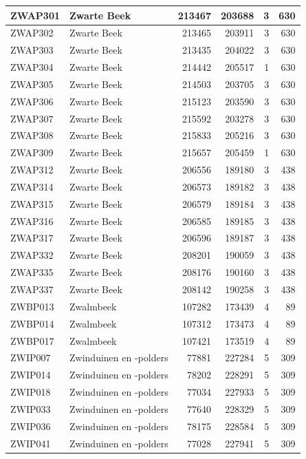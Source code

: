 \documentclass[11pt,]{book}
\begin{document}
\begin{table}
\begin{tabular}[t]{l|l|r|r|r|r}
\hline
ZWAP301 & Zwarte Beek & 213467 & 203688 & 3 & 630\\
\hline
ZWAP302 & Zwarte Beek & 213465 & 203911 & 3 & 630\\
\hline
ZWAP303 & Zwarte Beek & 213435 & 204022 & 3 & 630\\
\hline
ZWAP304 & Zwarte Beek & 214442 & 205517 & 1 & 630\\
\hline
ZWAP305 & Zwarte Beek & 214503 & 203705 & 3 & 630\\
\hline
ZWAP306 & Zwarte Beek & 215123 & 203590 & 3 & 630\\
\hline
ZWAP307 & Zwarte Beek & 215592 & 203278 & 3 & 630\\
\hline
ZWAP308 & Zwarte Beek & 215833 & 205216 & 3 & 630\\
\hline
ZWAP309 & Zwarte Beek & 215657 & 205459 & 1 & 630\\
\hline
ZWAP312 & Zwarte Beek & 206556 & 189180 & 3 & 438\\
\hline
ZWAP314 & Zwarte Beek & 206573 & 189182 & 3 & 438\\
\hline
ZWAP315 & Zwarte Beek & 206579 & 189184 & 3 & 438\\
\hline
ZWAP316 & Zwarte Beek & 206585 & 189185 & 3 & 438\\
\hline
ZWAP317 & Zwarte Beek & 206596 & 189187 & 3 & 438\\
\hline
ZWAP332 & Zwarte Beek & 208201 & 190059 & 3 & 438\\
\hline
ZWAP335 & Zwarte Beek & 208176 & 190160 & 3 & 438\\
\hline
ZWAP337 & Zwarte Beek & 208142 & 190258 & 3 & 438\\
\hline
ZWBP013 & Zwalmbeek & 107282 & 173439 & 4 & 89\\
\hline
ZWBP014 & Zwalmbeek & 107312 & 173473 & 4 & 89\\
\hline
ZWBP017 & Zwalmbeek & 107421 & 173519 & 4 & 89\\
\hline
ZWIP007 & Zwinduinen en -polders & 77881 & 227284 & 5 & 309\\
\hline
ZWIP014 & Zwinduinen en -polders & 78202 & 228291 & 5 & 309\\
\hline
ZWIP018 & Zwinduinen en -polders & 77034 & 227933 & 5 & 309\\
\hline
ZWIP033 & Zwinduinen en -polders & 77640 & 228329 & 5 & 309\\
\hline
ZWIP036 & Zwinduinen en -polders & 78175 & 228584 & 5 & 309\\
\hline
ZWIP041 & Zwinduinen en -polders & 77028 & 227941 & 5 & 309\\

\end{tabular}
\end{table}
\end{document}
